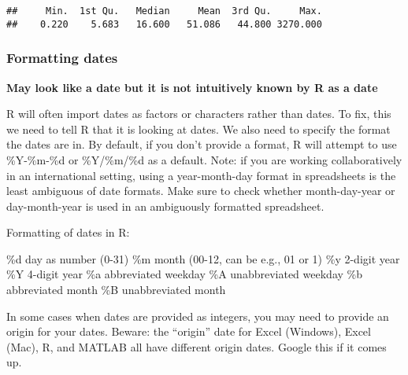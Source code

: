 \documentclass[]{article}
\newenvironment{Shaded}{\begin{snugshade}}{\end{snugshade}}
\newcommand{\CommentTok}[1]{\textcolor[rgb]{0.56,0.35,0.01}{\textit{#1}}}
\newcommand{\DataTypeTok}[1]{\textcolor[rgb]{0.13,0.29,0.53}{#1}}
\newcommand{\KeywordTok}[1]{\textcolor[rgb]{0.13,0.29,0.53}{\textbf{#1}}}
\newcommand{\NormalTok}[1]{#1}
\newcommand{\OperatorTok}[1]{\textcolor[rgb]{0.81,0.36,0.00}{\textbf{#1}}}
\newcommand{\StringTok}[1]{\textcolor[rgb]{0.31,0.60,0.02}{#1}}
\begin{document}
\begin{Shaded}
\end{Shaded}

\begin{verbatim}
##     Min.  1st Qu.   Median     Mean  3rd Qu.     Max. 
##    0.220    5.683   16.600   51.086   44.800 3270.000
\end{verbatim}

\hypertarget{formatting-dates}{%
\subsubsection{Formatting dates}\label{formatting-dates}}

\textbf{May look like a date but it is not intuitively known by R as a
date}

R will often import dates as factors or characters rather than dates. To
fix, this we need to tell R that it is looking at dates. We also need to
specify the format the dates are in. By default, if you don't provide a
format, R will attempt to use \%Y-\%m-\%d or \%Y/\%m/\%d as a default.
Note: if you are working collaboratively in an international setting,
using a year-month-day format in spreadsheets is the least ambiguous of
date formats. Make sure to check whether month-day-year or
day-month-year is used in an ambiguously formatted spreadsheet.

Formatting of dates in R:

\%d day as number (0-31) \%m month (00-12, can be e.g., 01 or 1) \%y
2-digit year \%Y 4-digit year \%a abbreviated weekday \%A unabbreviated
weekday \%b abbreviated month \%B unabbreviated month

In some cases when dates are provided as integers, you may need to
provide an origin for your dates. Beware: the ``origin'' date for Excel
(Windows), Excel (Mac), R, and MATLAB all have different origin dates.
Google this if it comes up.

\begin{Shaded}
\end{Shaded}
\end{document}
